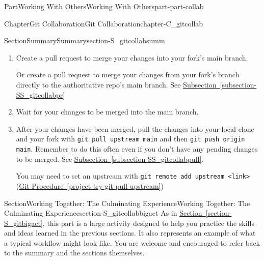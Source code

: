 \documentclass[oneside,10pt,]{book}
\newcommand{\xreffont}{\relax}
\newcommand{\mono}[1]{\texttt{#1}}
\begin{document}
\begin{partptx}{Part}{Working With Others}{}{Working With Others}{}{}{part-part-collab}
\begin{chapterptx}{Chapter}{Git Collaboration}{}{Git Collaboration}{}{}{chapter-C_gitcollab}
\begin{sectionptx}{Section}{Summary}{}{Summary}{}{}{section-S_gitcollabsumm}
\begin{enumerate}
\begin{enumerate}
\item{}Commit your files with \mono{git commit -m}. See \hyperref[subsection-SS_git-commit]{Subsection~{\xreffont\ref{subsection-SS_git-commit}}} and \hyperref[project-try-git-commit]{Git Procedure~{\xreffont\ref{project-try-git-commit}}}.%
\item{}Push your files back to your fork on GitHub (on your current branch) with \mono{git push origin}. See \hyperref[subsection-SS_git-push]{Subsection~{\xreffont\ref{subsection-SS_git-push}}}, \hyperref[subsection-SS_gitcollabpush]{Subsection~{\xreffont\ref{subsection-SS_gitcollabpush}}} and \hyperref[project-try-git-push]{Git Procedure~{\xreffont\ref{project-try-git-push}}}.%
\end{enumerate}
%
\item{}Create a pull request to merge your changes into your fork's main branch.%
\par
Or create a pull request to merge your changes from your fork's branch directly to the authoritative repo's main branch. See \hyperref[subsection-SS_gitcollabpr]{Subsection~{\xreffont\ref{subsection-SS_gitcollabpr}}}%
\item{}Wait for your changes to be merged into the main branch.%
\item{}After your changes have been merged, pull the changes into your local clone and your fork with \mono{git pull upstream main} and then \mono{git push origin main}. Remember to do this often even if you don't have any pending changes to be merged. See \hyperref[subsection-SS_gitcollabpull]{Subsection~{\xreffont\ref{subsection-SS_gitcollabpull}}}.%
\par
You may need to set an upstream with \mono{git remote add upstream <link>} (\hyperref[project-try-git-pull-upstream]{Git Procedure~{\xreffont\ref{project-try-git-pull-upstream}}})%
\end{enumerate}
%
\end{sectionptx}
%
%
\typeout{************************************************}
\typeout{************************************************}
%
\begin{sectionptx}{Section}{Working Together: The Culminating Experience}{}{Working Together: The Culminating Experience}{}{}{section-S_gitcollabbigact}
%
As in \hyperref[section-S_gitbigact]{Section~{\xreffont\ref{section-S_gitbigact}}}, this part is a large activity designed to help you practice the skills and ideas learned in the previous sections. It also represents an example of what a typical workflow might look like. You are welcome and encouraged to refer back to the summary and the sections themselves.%

\end{sectionptx}
\end{chapterptx}
\end{partptx}
\end{document}
